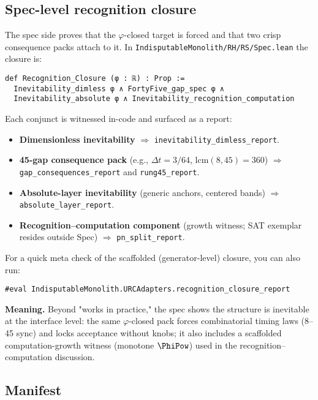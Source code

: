 \documentclass[11pt,a4paper,twoside]{article}
\numberwithin{equation}{section}
\renewcommand{\phi}{\varphi}
\theoremstyle{customthm}
\theoremstyle{customdef}
\theoremstyle{customrem}
\begin{document}
\subsection{Spec-level recognition closure}

The spec side proves that the \(\phi\)-closed target is forced and that two crisp consequence packs attach to it. In \texttt{IndisputableMonolith/RH/RS/Spec.lean} the closure is:

\begin{lstlisting}
def Recognition_Closure (φ : ℝ) : Prop :=
  Inevitability_dimless φ ∧ FortyFive_gap_spec φ ∧
  Inevitability_absolute φ ∧ Inevitability_recognition_computation
\end{lstlisting}

Each conjunct is witnessed in-code and surfaced as a report:
\begin{itemize}[leftmargin=*]
  \item \textbf{Dimensionless inevitability} \(\Rightarrow\) \texttt{inevitability\_dimless\_report}.
  \item \textbf{45-gap consequence pack} (e.g., \(\Delta t = 3/64\), \(\mathrm{lcm}(8,45)=360\)) \(\Rightarrow\) \texttt{gap\_consequences\_report} and \texttt{rung45\_report}.
  \item \textbf{Absolute-layer inevitability} (generic anchors, centered bands) \(\Rightarrow\) \texttt{absolute\_layer\_report}.
  \item \textbf{Recognition–computation component} (growth witness; SAT exemplar resides outside Spec) \(\Rightarrow\) \texttt{pn\_split\_report}.
\end{itemize}

For a quick meta check of the scaffolded (generator-level) closure, you can also run:

\begin{lstlisting}
#eval IndisputableMonolith.URCAdapters.recognition_closure_report
\end{lstlisting}

\textbf{Meaning.} Beyond "works in practice," the spec shows the structure is inevitable at the interface level: the same \(\phi\)-closed pack forces combinatorial timing laws (8–45 sync) and locks acceptance without knobs; it also includes a scaffolded computation-growth witness (monotone \(\PhiPow\)) used in the recognition–computation discussion.

\subsection{Manifest}
\end{document}
